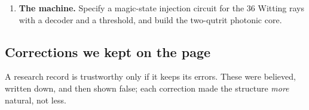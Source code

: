 \begin{enumerate}[label=\textbf{\arabic*.},leftmargin=1.6em,itemsep=5pt]
\begin{itemize}
      \item \emph{A geometric row.} Made geometric --- a level-three theta vector on the $\bar5$ torus --- that row fits
            all quark data with CP violation in a single Wilson-line phase. But no branch also gives the charged
            leptons at any matching scale (Passes~12045--12047), and the reactor angle still needs $\mu$--$\tau$
            breaking in the neutrino sector.
      \item \emph{Stabilisation.} The canonical modular-invariant potentials push the moduli away from the
            near-product region where the hierarchy lives (Pass~12048). Neither heterotic Wilson lines nor magnetic
            fluxes give the small off-diagonal modulus $\varepsilon\approx1/150$ naturally (Pass~12050).
      \item \emph{A conditional threshold.} An $SU(5)$-restoring Wilson-line threshold would supply exactly the
            coefficient the strong-CP divisor needs, with exactly one vectorlike pair (Pass~12049). It has no known
            string home.
      \end{itemize}
      Can any mass ratio or mixing angle be computed, with an error, from a stabilised vacuum with fewer
      parameters than data? Its sharpest form is now: \emph{what keeps $\varepsilon$ small?}
\item \textbf{The machine.} Specify a magic-state injection circuit for the $36$ Witting
      rays with a decoder and a threshold, and build the two-qutrit photonic core.
\end{enumerate}

\subsection{Corrections we kept on the page}

A research record is trustworthy only if it keeps its errors. These were believed,
written down, and then shown false; each correction made the structure \emph{more}
natural, not less.

